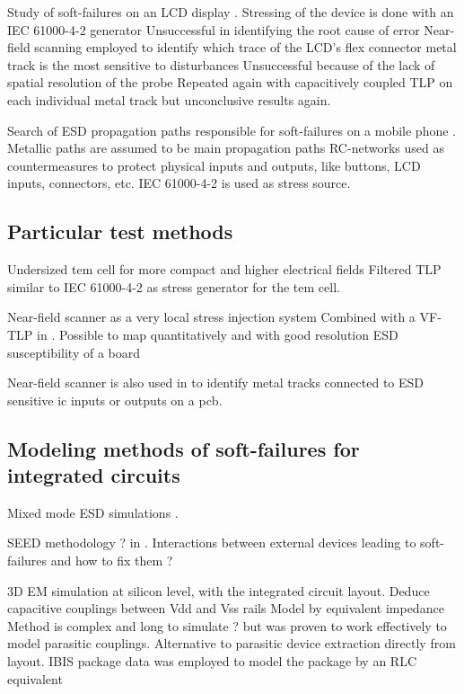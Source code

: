 Study of soft-failures on an LCD display \cite{softFailLCD}.
Stressing of the device is done with an IEC 61000-4-2 generator
Unsuccessful in identifying the root cause of error
Near-field scanning employed to identify which trace of the LCD's flex connector metal track is the most sensitive to disturbances
Unsuccessful because of the lack of spatial resolution of the probe
Repeated again with capacitively coupled TLP on each individual metal track but unconclusive results again.

Search of ESD propagation paths responsible for soft-failures on a mobile phone \cite{softFailMobile}.
Metallic paths are assumed to be main propagation paths
RC-networks used as countermeasures to protect physical inputs and outputs, like buttons, LCD inputs, connectors, etc.
IEC 61000-4-2 is used as stress source.

\subsection{Particular test methods}

%
Undersized \gls{tem} cell for more compact and higher electrical fields \cite{SDRAMCase}
Filtered TLP similar to IEC 61000-4-2 \cite{iec61000-4-2} as stress generator for the \gls{tem} cell.

%
Near-field scanner as a very local stress injection system
Combined with a VF-TLP in \cite{NearFieldInjectionFabrice}.
Possible to map quantitatively and with good resolution ESD susceptibility of a board

%
Near-field scanner is also used in \cite{NearFieldInjectionBis} to identify metal tracks connected to ESD sensitive \gls{ic} inputs or outputs on a \gls{pcb}.


\subsection{Modeling methods of soft-failures for integrated circuits}

%
Mixed mode ESD simulations \cite{mixedModeESDSims}.

%
SEED methodology ? in \cite{usb2ESDProtection}.
Interactions between external devices leading to soft-failures and how to fix them ?

3D EM simulation \cite{LacrampeTransientImmunity} at silicon level, with the integrated circuit layout.
Deduce capacitive couplings between Vdd and Vss rails
Model by equivalent impedance
Method is complex and long to simulate ? but was proven to work effectively to model parasitic couplings.
Alternative to parasitic device extraction directly from layout.
IBIS package data was employed to model the package by an RLC equivalent

